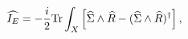 \begin{equation}
\widehat{I_E}=-\frac{i}{2} {\rm Tr}\int_X\left[\widehat\Sigma\wedge\widehat R-
(\widehat\Sigma\wedge\widehat R)^\dagger\right],\label{accion5}
\end{equation}

